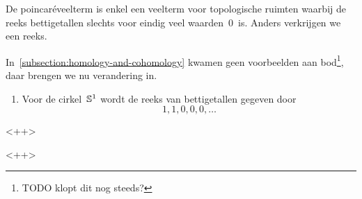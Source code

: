 \documentclass[a4paper,11pt]{article}
\begin{document}
\begin{remark}
  De poincar\'eveelterm is enkel een veelterm voor topologische ruimten waarbij de reeks bettigetallen slechts voor eindig veel waarden~$0$~is. Anders verkrijgen we een reeks.
\end{remark}

In~\cref{subsection:homology-and-cohomology} kwamen geen voorbeelden aan bod\footnote{TODO klopt dit nog steeds?}, daar brengen we nu verandering in.
\begin{example}
  \begin{enumerate}
    \item Voor de cirkel~$\mathbb{S}^1$ wordt de reeks van bettigetallen gegeven door
      \begin{equation}
        1,1,0,0,0,\ldots
      \end{equation}

  \end{enumerate}<++>
\end{example}<++>




\nocite{*}


\end{document}
